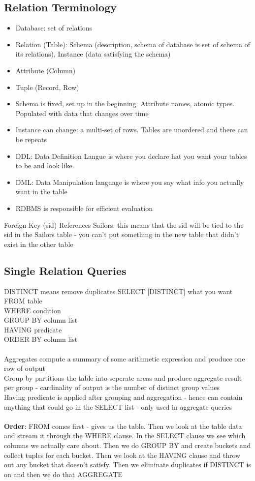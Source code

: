 \documentclass{article}
\begin{document}
\subsection{Relation Terminology}
\begin{itemize}
\item Database: set of relations
\item Relation (Table): Schema (description, schema of database is set of schema of its relations), Instance (data satisfying the schema)
\item Attribute (Column)
\item Tuple (Record, Row)
\item Schema is fixed, set up in the beginning. Attribute names, atomic types. Populated with data that changes over time
\item Instance can change: a multi-set of rows. Tables are unordered and there can be repeats
\item DDL: Data Definition Langue is where you declare hat you want your tables to be and look like.
\item DML: Data Manipulation language is where you say what info you actually want in the table
\item RDBMS is responsible for efficient evaluation
\end{itemize}
Foreign Key (sid) References Sailors: this means that the sid will be tied to the sid in the Sailors table - you can't put something in the new table that didn't exist in the other table

\subsection{Single Relation Queries}
DISTINCT means remove duplicates
SELECT [DISTINCT] what you want \\
FROM table  \\
WHERE condition \\
GROUP BY column list\\ 
HAVING predicate \\
ORDER BY  column list\\
\\
Aggregates compute a summary of some arithmetic expression and produce one row of output \\
Group by partitions the table into seperate areas and produce aggregate result per group - cardinality of output is the number of distinct group values \\ 
Having predicate is applied after grouping and aggregation - hence can contain anything that could go in the SELECT list - only used in aggregate queries \\ \\ 
\textbf{Order}: FROM comes first - gives us the table. Then we look at the table data and stream it through the WHERE clause. In the SELECT clause we see which columns we actually care about. Then we do GROUP BY and create buckets and collect tuples for each bucket. Then we look at the HAVING clause and throw out any bucket that doesn't satisfy. Then we eliminate duplicates if DISTINCT is on and then we do that AGGREGATE 
\end{document}
